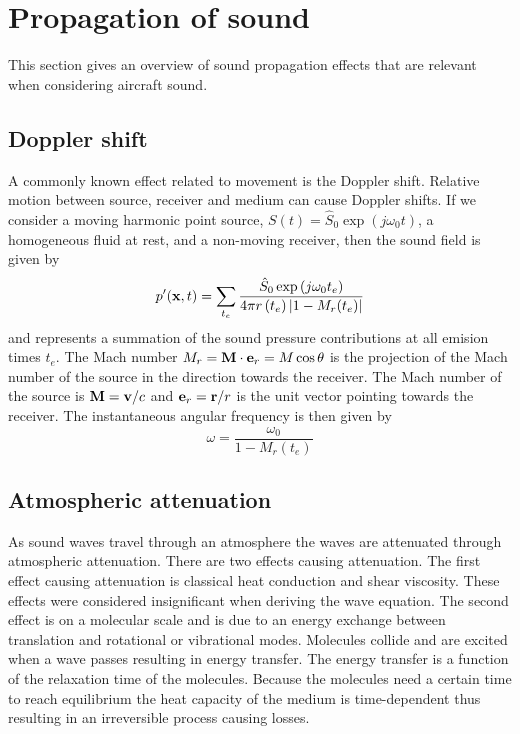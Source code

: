 \section{Propagation of sound}

This section gives an overview of sound propagation effects that are relevant when considering aircraft sound.

\subsection{Doppler shift}\label{sec:theory:propagation:doppler}
A commonly known effect related to movement is the Doppler shift.
Relative motion between source, receiver and medium can cause
Doppler shifts. If we consider a moving harmonic point source, $S(t) = \hat{S}_0
\exp{\left(j\omega_0 t\right)} $, a homogeneous fluid at rest, and a non-moving receiver, then the sound
field is given by
\begin{equation}
  p'(\mathbf{x},t) = \sum_{t_e} \frac{\hat{S}_0 \exp{\left(j \omega_0 t_e\right)}}{4\pi r \left(t_e\right) \lvert1-M_r (t_e)\rvert}
\end{equation}
and represents a summation of the sound pressure contributions at all emision
times $t_e$. The Mach number $M_r = \mathbf{M} \cdot \mathbf{e}_r = M \cos{\theta}$ is
the projection of the Mach number of the source in the direction towards the
receiver. The Mach number of the source is $\mathbf{M}=\mathbf{v}/c$ and
$\mathbf{e}_r=\mathbf{r}/r$ is the unit vector pointing towards the receiver.
The instantaneous angular frequency is then given by
\begin{equation}
  \omega = \frac{\omega_0}{1 - M_r(t_e)}
\end{equation}



\subsection{Atmospheric attenuation}\label{sec:theory_sound_atmospheric_attenuation}
As sound waves travel through an atmosphere the waves are attenuated through
atmospheric attenuation. There are two effects causing attenuation. The first
effect causing attenuation is classical heat conduction and shear viscosity.
These effects were considered insignificant when deriving the wave equation. The
second effect is on a molecular scale and is due to an energy exchange between
translation and rotational or vibrational modes. Molecules collide and are
excited when a wave passes resulting in energy transfer. The energy transfer is
a function of the relaxation time of the molecules. Because the molecules need a
certain time to reach equilibrium the heat capacity of the medium is
time-dependent thus resulting in an irreversible process causing losses.

